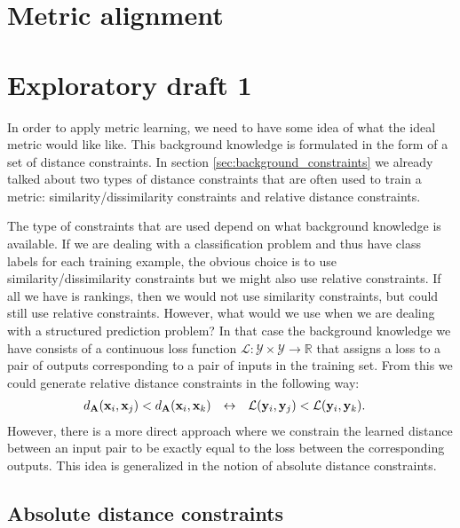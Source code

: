 \section{Metric alignment}






\section*{Exploratory draft 1}

In order to apply metric learning, we need to have some idea of what the ideal metric would like like. This background knowledge is formulated in the form of a set of distance constraints. In section \ref{sec:background_constraints} we already talked about two types of distance constraints that are often used to train a metric: similarity/dissimilarity constraints and relative distance constraints.

The type of constraints that are used depend on what background knowledge is available. If we are dealing with a classification problem and thus have class labels for each training example, the obvious choice is to use similarity/dissimilarity constraints but we might also use relative constraints. If all we have is rankings, then we would not use similarity constraints, but could still use relative constraints. However, what would we use when we are dealing with a structured prediction problem? In that case the background knowledge we have consists of a continuous loss function $\mathcal{L}: \mathcal{Y} \times \mathcal{Y} \rightarrow \mathbb{R}$ that assigns a loss to a pair of outputs corresponding to a pair of inputs in the training set. From this we could generate relative distance constraints in the following way:
\begin{align}
d_{\mathbf{A}}(\mathbf{x}_i, \mathbf{x}_j) &< d_{\mathbf{A}}(\mathbf{x}_i, \mathbf{x}_k) &\leftrightarrow&&\mathcal{L}(\mathbf{y}_i, \mathbf{y}_j) &< \mathcal{L}(\mathbf{y}_i, \mathbf{y}_k).
\end{align}
However, there is a more direct approach where we constrain the learned distance between an input pair to be exactly equal to the loss between the corresponding outputs. This idea is generalized in the notion of absolute distance constraints.



\subsection{Absolute distance constraints}

